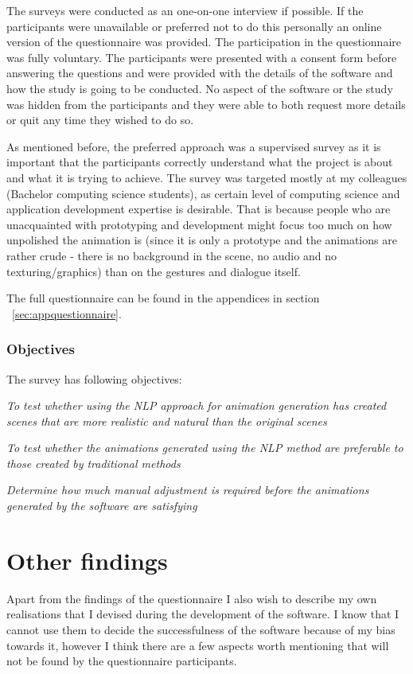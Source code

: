 The surveys were conducted as an one-on-one interview if possible. If the participants were unavailable or preferred not to do this personally an online version of the questionnaire was provided. The participation in the questionnaire was fully voluntary. The participants were presented with a consent form before answering the questions and were provided with the details of the software and how the study is going to be conducted. No aspect of the software or the study was hidden from the participants and they were able to both request more details or quit any time they wished to do so.

As mentioned before, the preferred approach was a supervised survey as it is important that the participants correctly understand what the project is about and what it is trying to achieve. The survey was targeted mostly at my colleagues (Bachelor computing science students), as certain level of computing science and application development expertise is desirable. That is because people who are unacquainted with prototyping and development might focus too much on how unpolished the animation is (since it is only a prototype and the animations are rather crude - there is no background in the scene, no audio and no texturing/graphics) than on the gestures and dialogue itself.

The full questionnaire can be found in the appendices in section ~\ref{sec:appquestionnaire}.

\medskip
\subsubsection{Objectives}
The survey has following objectives:

\begin{addmargin}[2em]{2em}
	\noindent \textit{To test whether using the NLP approach for animation generation has created scenes that are more realistic and natural than the original scenes}
	
	\medskip
	
	\noindent \textit{To test whether the animations generated using the NLP method are preferable to those created by traditional methods}
	\medskip
	
	\noindent \textit{Determine how much manual adjustment is required before the animations generated by the software are satisfying}
\end{addmargin}



\section{Other findings \label{sec:evalotherfindings}}
Apart from the findings of the questionnaire I also wish to describe my own realisations that I devised during the development of the software. I know that I cannot use them to decide the successfulness of the software because of my bias towards it, however I think there are a few aspects worth mentioning that will not be found by the questionnaire participants.

